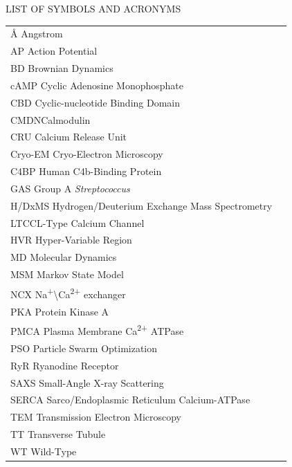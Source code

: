 \documentclass[12pt]{ucsddissertation}
\newcommand\tab[1][1cm]{\hspace*{#1}}
\begin{document}
\tableofcontents

\clearpage
\begin{center}
LIST OF SYMBOLS AND ACRONYMS
\end{center}
{}

{\doublespacing
 \setlength{\parindent}{1pt} 
 

\noindent\begin{tabular}{@{}l l}
\si{\angstrom} \tab[5.45cm]Angstrom\\
AP \tab[5.15cm]Action Potential\\
BD \tab[5.2cm]Brownian Dynamics\\
cAMP \tab[4.65cm]Cyclic Adenosine Monophosphate\\
CBD \tab[4.86cm]Cyclic-nucleotide Binding Domain\\
CMDN\tab[4.54cm]Calmodulin\\
CRU \tab[4.74cm] Calcium Release Unit\\
Cryo-EM \tab[4.09cm]Cryo-Electron Microscopy\\
C4BP \tab[4.6cm] Human C4b-Binding Protein\\
GAS \tab[4.76cm] Group A \textit{Streptococcus}\\
H/DxMS \tab[4.05cm] Hydrogen/Deuterium Exchange Mass Spectrometry\\
LTCC\tab[4.8cm]L-Type Calcium Channel\\
HVR \tab[4.7cm]  Hyper-Variable Region\\
MD \tab[5cm]Molecular Dynamics\\
MSM \tab[4.7cm]Markov State Model\\
NCX \tab[4.7cm] Na\textsuperscript{+}\textbackslash Ca\textsuperscript{2+} exchanger\\
PKA \tab[4.85cm]Protein Kinase A\\
PMCA \tab[4.5cm]Plasma Membrane Ca\textsuperscript{2+} ATPase\\
PSO \tab[4.9cm]Particle Swarm Optimization\\
RyR \tab[4.9cm]Ryanodine Receptor\\
SAXS \tab[4.6cm]Small-Angle X-ray Scattering\\
SERCA \tab[4.33cm]Sarco/Endoplasmic Reticulum Calcium-ATPase\\
TEM \tab[4.75cm]Transmission Electron Microscopy\\
TT \tab[5.15cm]Transverse Tubule\\
WT \tab[5.02cm]Wild-Type\\



\end{tabular}}
\end{document}
